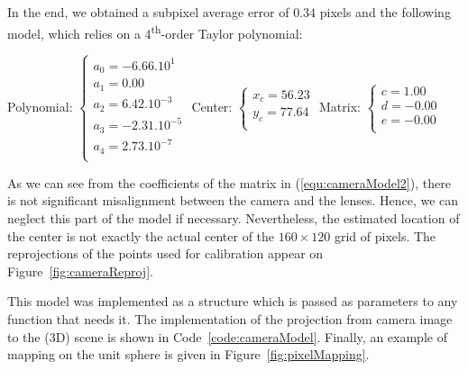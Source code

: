 In the end, we obtained a subpixel average error of $0.34$ pixels and the following model, which relies on a 4\textsuperscript{th}-order Taylor polynomial:\\
\begin{center}
Polynomial:
$
\begin{cases}
a_0 = -6.66 . 10^{1}\\ 
a_1 = 0.00 \\
a_2 = 6.42 . 10^{-3} \\
a_3 = -2.31 . 10^{-5} \\
a_4 = 2.73 . 10^{-7} \\
\end{cases}
$
\hfill
Center:
$
\begin{cases}
x_c = 56.23 \\
y_c = 77.64 \\
\end{cases}
$
\hfill
Matrix:
$
\begin{cases}
c = 1.00 \\
d = -0.00 \\
e = -0.00 \\
\end{cases}
$
\end{center}
As we can see from the coefficients of the matrix in (\ref{equ:cameraModel2}), there is not significant misalignment between the camera and the lenses. Hence, we can neglect this part of the model if necessary. Nevertheless, the estimated location of the center is not exactly the actual center of the $160 \times 120$ grid of pixels. The reprojections of the points used for calibration appear on Figure~\ref{fig:cameraReproj}. 

This model was implemented as a structure which is passed as parameters to any function that needs it. The implementation of the projection from camera image to the (3D) scene is shown in Code~\ref{code:cameraModel}. Finally, an example of mapping on the unit sphere is given in Figure~\ref{fig:pixelMapping}.

\newpage


